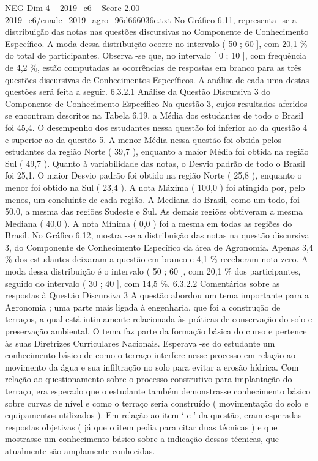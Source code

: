 \begin{textsample}{NEG Dim 4 – 2019\_c6 – Score 2.00 – 2019\_c6/enade\_2019\_agro\_96d666036e.txt}
No Gráfico 6.11, representa -se a distribuição das notas nas questões discursivas no Componente de Conhecimento Específico.
A moda dessa distribuição ocorre no intervalo ( 50 ; 60 ], com 20,1 \% do total de participantes.
Observa -se que, no intervalo [ 0 ; 10 ], com frequência de 4,2 \%, estão computadas as ocorrências de respostas em branco para as três questões discursivas de Conhecimentos Específicos.
A análise de cada uma destas questões será feita a seguir. 6.3.2.1 Análise da Questão Discursiva 3 do Componente de Conhecimento Específico Na questão 3, cujos resultados aferidos se encontram descritos na Tabela 6.19, a Média dos estudantes de todo o Brasil foi 45,4.
O desempenho dos estudantes nessa questão foi inferior ao da questão 4 e superior ao da questão 5.
A menor Média nessa questão foi obtida pelos estudantes da região Norte ( 39,7 ), enquanto a maior Média foi obtida na região Sul ( 49,7 ).
Quanto à variabilidade das notas, o Desvio padrão de todo o Brasil foi 25,1.
O maior Desvio padrão foi obtido na região Norte ( 25,8 ), enquanto o menor foi obtido na Sul ( 23,4 ).
A nota Máxima ( 100,0 ) foi atingida por, pelo menos, um concluinte de cada região.
A Mediana do Brasil, como um todo, foi 50,0, a mesma das regiões Sudeste e Sul.
As demais regiões obtiveram a mesma Mediana ( 40,0 ).
A nota Mínima ( 0,0 ) foi a mesma em todas as regiões do Brasil.
No Gráfico 6.12, mostra -se a distribuição das notas na questão discursiva 3, do Componente de Conhecimento Específico da área de Agronomia.
Apenas 3,4 \% dos estudantes deixaram a questão em branco e 4,1 \% receberam nota zero.
A moda dessa distribuição é o intervalo ( 50 ; 60 ], com 20,1 \% dos participantes, seguido do intervalo ( 30 ; 40 ], com 14,5 \%. 6.3.2.2 Comentários sobre as respostas à Questão Discursiva 3 A questão abordou um tema importante para a Agronomia ; uma parte mais ligada à engenharia, que foi a construção de terraços, a qual está intimamente relacionada às práticas de conservação do solo e preservação ambiental.
O tema faz parte da formação básica do curso e pertence às suas Diretrizes Curriculares Nacionais.
Esperava -se do estudante um conhecimento básico de como o terraço interfere nesse processo em relação ao movimento da água e sua infiltração no solo para evitar a erosão hídrica.
Com relação ao questionamento sobre o processo construtivo para implantação do terraço, era esperado que o estudante também demonstrasse conhecimento básico sobre curvas de nível e como o terraço seria construído ( movimentação do solo e equipamentos utilizados ).
Em relação ao item ‘ c ’ da questão, eram esperadas respostas objetivas ( já que o item pedia para citar duas técnicas ) e que mostrasse um conhecimento básico sobre a indicação dessas técnicas, que atualmente são amplamente conhecidas.

\end{textsample}
